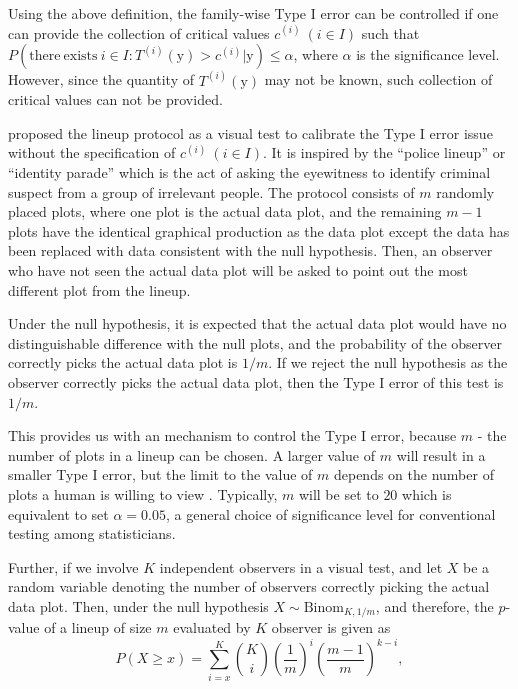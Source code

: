 \documentclass[]{interact}
\theoremstyle{plain}%
\theoremstyle{definition}
\theoremstyle{remark}
\begin{document}
Using the above definition, the family-wise Type I error can be
controlled if one can provide the collection of critical values
\(c^{(i)}~(i \in I)\) such that
\(P(\mathrm{there~exists~} i \in I: T^{(i)}(\boldsymbol{\mathrm{y}}) > c^{(i)}|\boldsymbol{\mathrm{y}}) \leq \alpha\),
where \(\alpha\) is the significance level. However, since the quantity
of \(T^{(i)}(\boldsymbol{\mathrm{y}})\) may not be known, such
collection of critical values can not be provided.

\citet{buja_statistical_2009} proposed the lineup protocol as a visual
test to calibrate the Type I error issue without the specification of
\(c^{(i)}~(i \in I)\). It is inspired by the ``police lineup'' or
``identity parade'' which is the act of asking the eyewitness to
identify criminal suspect from a group of irrelevant people. The
protocol consists of \(m\) randomly placed plots, where one plot is the
actual data plot, and the remaining \(m - 1\) plots have the identical
graphical production as the data plot except the data has been replaced
with data consistent with the null hypothesis. Then, an observer who
have not seen the actual data plot will be asked to point out the most
different plot from the lineup.

Under the null hypothesis, it is expected that the actual data plot
would have no distinguishable difference with the null plots, and the
probability of the observer correctly picks the actual data plot is
\(1/m\). If we reject the null hypothesis as the observer correctly
picks the actual data plot, then the Type I error of this test is
\(1/m\).

This provides us with an mechanism to control the Type I error, because
\(m\) - the number of plots in a lineup can be chosen. A larger value of
\(m\) will result in a smaller Type I error, but the limit to the value
of \(m\) depends on the number of plots a human is willing to view
\citep{buja_statistical_2009}. Typically, \(m\) will be set to \(20\)
which is equivalent to set \(\alpha = 0.05\), a general choice of
significance level for conventional testing among statisticians.

Further, if we involve \(K\) independent observers in a visual test, and
let \(X\) be a random variable denoting the number of observers
correctly picking the actual data plot. Then, under the null hypothesis
\(X \sim \mathrm{Binom}_{K,1/m}\), and therefore, the \(p\)-value of a
lineup of size \(m\) evaluated by \(K\) observer is given as
\begin{equation} \label{eq:pvaluesingle}
P(X \geq x) = \sum_{i=x}^{K}{{K}\choose{i}}\left(\frac{1}{m}\right)^i\left(\frac{m-1}{m}\right)^{k-i},
\end{equation}
\end{document}
